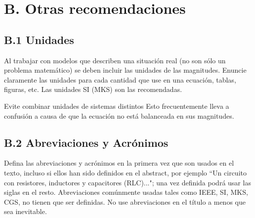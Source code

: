 \documentclass[letterpaper, 10 pt, conference]{ieeeconf}  %
\begin{document}
\section*{B.  Otras recomendaciones}
 
\subsection*{B.1		Unidades}

Al trabajar con modelos que describen una situaci\'on real (no son s\'olo un problema matem\'atico) se deben incluir las unidades de las magnitudes. Enuncie claramente las unidades para cada cantidad que use en una ecuaci\'on, tablas, figuras, etc. Las unidades SI (MKS) son las recomendadas.

Evite combinar unidades de sistemas distintos Esto frecuentemente lleva a confusi\'on a causa de que la ecuaci\'on no est\'a balanceada en sus magnitudes. 

\subsection*{B.2		Abreviaciones y Acr\'onimos}

Defina las abreviaciones y acr\'onimos en la primera vez que son usados en el texto, incluso si ellos han sido definidos en el abstract, por ejemplo ``Un circuito con resistores, inductores y capacitores (RLC)..."; una vez definida podr\'a usar las siglas en el resto.  Abreviaciones com\'unmente usadas tales como IEEE, SI, MKS, CGS, no tienen que ser definidas.  No use abreviaciones en el t\'itulo a menos que sea inevitable.






\end{document}
